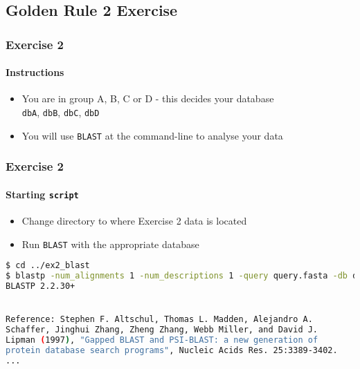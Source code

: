 %

\subsection{Golden Rule 2 Exercise}
\begin{frame}
  \frametitle{Exercise 2}
  \framesubtitle{Instructions}    
  \begin{itemize}
    \item You are in group A, B, C or D - this decides your database\\
    \texttt{dbA}, \texttt{dbB}, \texttt{dbC}, \texttt{dbD}
    \item You will use \texttt{BLAST} at the command-line to analyse your data
  \end{itemize}
\end{frame}

\begin{frame}[fragile]
  \frametitle{Exercise 2}
  \framesubtitle{Starting \texttt{script}}    
  \begin{itemize}
    \item Change directory to where Exercise 2 data is located
    \item Run \texttt{BLAST} with the appropriate database
  \end{itemize}
\begin{lstlisting}[language=bash]
$ cd ../ex2_blast
$ blastp -num_alignments 1 -num_descriptions 1 -query query.fasta -db dbA
BLASTP 2.2.30+


Reference: Stephen F. Altschul, Thomas L. Madden, Alejandro A.
Schaffer, Jinghui Zhang, Zheng Zhang, Webb Miller, and David J.
Lipman (1997), "Gapped BLAST and PSI-BLAST: a new generation of
protein database search programs", Nucleic Acids Res. 25:3389-3402.
...
\end{lstlisting}    
\end{frame}

